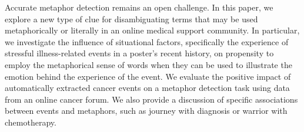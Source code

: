 Accurate metaphor detection remains an open challenge. In this paper, we explore a new type of clue for disambiguating terms that may be used metaphorically or literally in an online medical support community. In particular, we investigate the influence of situational factors, specifically the experience of stressful illness-related events in a poster's recent history, on propensity to employ the metaphorical sense of words when they can be used to illustrate the emotion behind the experience of the event.  We evaluate the positive impact of automatically extracted cancer events on a metaphor detection task using data from an online cancer forum.  We also provide a discussion of specific associations between events and metaphors, such as journey with diagnosis or warrior with chemotherapy.
